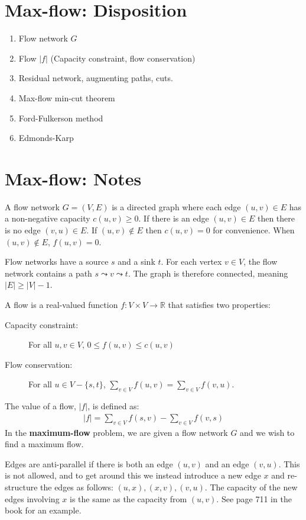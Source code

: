 \section{Max-flow: Disposition}
\begin{enumerate}
	\item Flow network $G$
	\item Flow $|f|$ (Capacity constraint, flow conservation)
	\item Residual network, augmenting paths, cuts.
	\item Max-flow min-cut theorem
	\item Ford-Fulkerson method
	\item Edmonds-Karp
\end{enumerate}
\section{Max-flow: Notes}
A flow network $G = (V,E)$ is a directed graph where each edge $(u,v) \in E$ has
a non-negative capacity $c(u,v) \geq 0$. If there is an edge $(u,v) \in E$ then
there is no edge $(v,u) \in E$. If $(u,v) \notin E$ then $c(u,v) = 0$ for convenience.
When $(u,v) \notin E$, $f(u,v) = 0$.

Flow networks have a source $s$ and a sink $t$. For each vertex $v \in V$, the flow
network contains a path $s \leadsto v \leadsto t$. The graph is therefore connected, meaning
$|E| \geq |V| - 1$.

A flow is a real-valued function $f : V \times V \rightarrow \mathbb{R}$ that satisfies
two properties:
\begin{description}
	\item[Capacity constraint:] For all $u,v \in V$, $0 \leq f(u,v) \leq c(u,v)$

	\item[Flow conservation:] For all $u \in V - \{s,t\}$, 
	$\sum_{v \in V} f(u,v) = \sum_{v \in V} f(v,u)$.
\end{description}
The value of a flow, $|f|$, is defined as:
\begin{align*}
	|f| = \sum_{v \in V} f(s,v) - \sum_{v \in V} f(v,s)
\end{align*}
In the \textbf{maximum-flow} problem, we are given a flow network $G$ and we wish to find
a maximum flow.

Edges are anti-parallel if there is both an edge $(u,v)$ and an edge $(v,u)$. This is not allowed,
and to get around this we instead introduce a new edge $x$ and re-structure the edges as follows:
$(u,x), (x,v), (v,u)$. The capacity of the new edges involving $x$ is the same as the capacity from
$(u,v)$. See page 711 in the book for an example.

